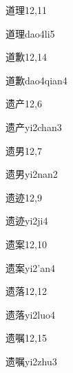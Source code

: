 \begin{entry}{道理}{12,11}
  \begin{phonetics}{道理}{dao4li5}
  \end{phonetics}
\end{entry}

\begin{entry}{道歉}{12,14}
  \begin{phonetics}{道歉}{dao4qian4}
  \end{phonetics}
\end{entry}

\begin{entry}{遗产}{12,6}
  \begin{phonetics}{遗产}{yi2chan3}
  \end{phonetics}
\end{entry}

\begin{entry}{遗男}{12,7}
  \begin{phonetics}{遗男}{yi2nan2}
  \end{phonetics}
\end{entry}

\begin{entry}{遗迹}{12,9}
  \begin{phonetics}{遗迹}{yi2ji4}
  \end{phonetics}
\end{entry}

\begin{entry}{遗案}{12,10}
  \begin{phonetics}{遗案}{yi2'an4}
  \end{phonetics}
\end{entry}

\begin{entry}{遗落}{12,12}
  \begin{phonetics}{遗落}{yi2luo4}
  \end{phonetics}
\end{entry}

\begin{entry}{遗嘱}{12,15}
  \begin{phonetics}{遗嘱}{yi2zhu3}
  \end{phonetics}
\end{entry}

